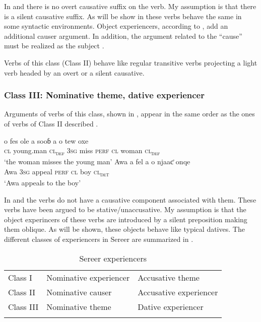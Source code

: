 \documentclass[output=paper]{langscibook}
\begin{document}
In  and  there is no overt causative suffix on the verb. My assumption is  that there is a silent causative suffix. As will be show in  these verbs behave the same in some syntactic environments. Object experiencers, according to \citet{Pesetsky1995}, add an additional causer argument. In addition, the argument related to the “cause” must be realized as the subject \citep{Grimshaw1990}.

Verbs of this class (Class II) behave like regular transitive verbs projecting a light verb headed by an overt or a silent causative.

\subsubsection{Class III: Nominative theme, dative experiencer}

Arguments of verbs of this class, shown in , appear in the same order as the ones of verbs of Class II described .

\ea \label{ex:tamba:7}
\ea \label{ex:tamba:7a}
\gll o  fes              ole         a          sooɓ  a        o  tew        oxe\\
    \textsc{cl} young.man  \textsc{cl\textsubscript{def}}    \textsc{3sg}       miss  \textsc{perf}   \textsc{cl}  woman \textsc{cl\textsubscript{def}}\\
\glt `the woman  misses the young man'
\ex \label{ex:tamba:7b}
\gll Awa a     fel         a       o     njaaƈ onqe\\
Awa \textsc{3sg} appeal \textsc{perf}  \textsc{cl}   boy   \textsc{cl\textsubscript{det} }\\
\glt `Awa appeals to the boy'
\z
\z

In  and  the verbs do not have a causative component associated with them. These verbs have been argued to be stative/unaccusative. My assumption is that the object experincers of these verbs are introduced by a silent preposition making them oblique. As will be shown, these objects behave like typical datives. The different classes of experiencers in Sereer are summarized in .
 
\begin{table}
\caption{Sereer experiencers}
\label{tab:tamba:2}
\begin{tabular}{lll}
\lsptoprule
{Class I} & Nominative experiencer & Accusative theme\\
{Class II} & Nominative causer & Accusative experiencer\\
{Class III} & Nominative theme & Dative experiencer\\
\lspbottomrule
\end{tabular}
\end{table}
\end{document}
